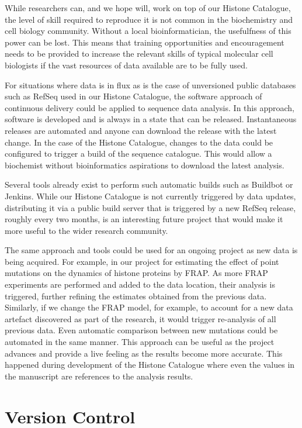 While researchers can, and we hope will, work on top of our
Histone Catalogue, the level of skill required to reproduce it is not
common in the biochemistry and cell biology community.
Without a local bioinformatician, the
usefulfness of this power can be lost.  This means that training
opportunities and encouragement needs to be provided to increase the
relevant skills of typical molecular cell biologists if the vast
resources of data available are to be fully used.

For situations where data is in
flux as is the case of unversioned public databases such as RefSeq
used in our Histone Catalogue, the software
approach of continuous delivery could be applied to sequence data
analysis.  In this approach,
software is developed and is always in a state that can be
released.  Instantaneous releases are automated and anyone can download the
release with the latest change.  In the case of the Histone Catalogue,
changes to the data could be configured to
trigger a build of the sequence catalogue.  This would allow a biochemist
without bioinformatics aspirations to download the latest analysis.

Several tools already exist to perform such automatic builds such as
Buildbot or Jenkins.  While our Histone Catalogue is not currently
triggered by data updates, distributing it via a public build server
that is triggered by a new RefSeq release, roughly every two months,
is an interesting future project that would make it more useful to the
wider research community.

The same approach and tools could be used for an ongoing project as
new data is being acquired.  For example, in our project for
estimating the effect of point mutations on the dynamics of histone
proteins by FRAP. As more FRAP experiments are performed and added to
the data location, their analysis is triggered, further refining the
estimates obtained from the previous data.  Similarly, if we change
the FRAP model, for example, to account for a new data artefact
discovered as part of the research, it would trigger re-analysis of
all previous data.  Even automatic comparison between new mutations
could be automated in the same manner.
This approach can be useful as the project
advances and provide a live feeling as the results become more
accurate.
This happened during development of the Histone Catalogue where even
the values in the manuscript are references to the analysis results.

\section{Version Control}

